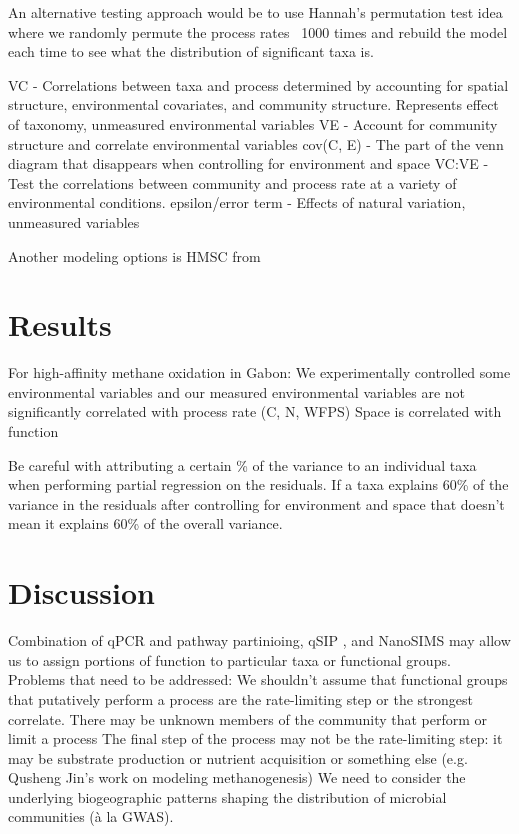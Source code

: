 \documentclass{article}
\begin{document}
An alternative testing approach would be to use Hannah’s permutation test idea
where we randomly permute the process rates ~1000 times and rebuild the model
each time to see what the distribution of significant taxa is.

VC - Correlations between taxa and process determined by accounting for spatial
structure, environmental covariates, and community structure. Represents effect
of taxonomy, unmeasured environmental variables VE - Account for community
structure and correlate environmental variables cov(C, E) - The part of the venn
diagram that disappears when controlling for environment and space VC:VE - Test
the correlations between community and process rate at a variety of
environmental conditions.  epsilon/error term - Effects of natural variation,
unmeasured variables

Another modeling options is HMSC from \cite{ovaskainen2017} 

\section{Results}

For high-affinity methane oxidation in Gabon: We experimentally controlled some
environmental variables and our measured environmental variables are not
significantly correlated with process rate (C, N, WFPS) Space is correlated with
function



Be careful with attributing a certain \% of the variance to an individual taxa
when performing partial regression on the residuals. If a taxa explains 60\% of
the variance in the residuals after controlling for environment and space that
doesn’t mean it explains 60\% of the overall variance.

\section{Discussion}
Combination of qPCR and pathway partinioing, qSIP \citep{hungate2015},
and NanoSIMS \citep{mayali2012} may allow us to assign portions of
function to particular taxa or functional groups.
Problems that need to be addressed: We shouldn’t assume that functional groups
that putatively perform a process are the rate-limiting step or the strongest
correlate.  There may be unknown members of the community that perform or limit
a process The final step of the process may not be the rate-limiting step: it
may be substrate production or nutrient acquisition or something else (e.g.
Qusheng Jin’s work on modeling methanogenesis) We need to consider the
underlying biogeographic patterns shaping the distribution of microbial
communities (à la GWAS). 
\end{document}
